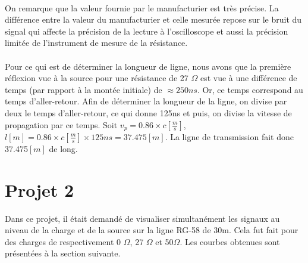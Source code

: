 \paragraph{}On remarque que la valeur fournie par le manufacturier est très précise. La différence entre la valeur du manufacturier et celle mesurée repose sur le bruit du signal qui affecte la précision de la lecture à l'oscilloscope et aussi la précision limitée de l'instrument de mesure de la résistance. 

\paragraph{}Pour ce qui est de déterminer la longueur de ligne, nous avons que la première réflexion vue à la source pour une résistance de 27 $\Omega$ est vue à une différence de temps (par rapport à la montée initiale) de $\approx 250ns$. Or, ce temps correspond au temps d'aller-retour. Afin de déterminer la longueur de la ligne, on divise par deux le temps d'aller-retour, ce qui donne 125ns et puis, on divise la vitesse de propagation par ce temps. Soit $v_p = 0.86 \times c \left[\frac{m}{s}\right]$, $l \left[m\right] = 0.86\times c \left[\frac{m}{s}\right] \times 125 ns = 37.475 \left[m\right]$. La ligne de transmission fait donc 37.475$\left[m\right]$ de long.

\section{Projet 2}

Dans ce projet, il était demandé de visualiser simultanément les signaux au niveau de la charge et de la source sur la ligne RG-58 de 30m. Cela fut fait pour des charges de respectivement 0 $\Omega$, 27 $\Omega$ et 50$\Omega$. Les courbes obtenues sont présentées à la section suivante.
